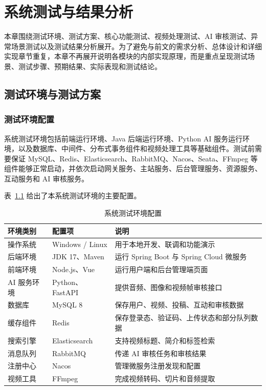 
\chapter{系统测试与结果分析}
\label{chap:system-test-analysis}

本章围绕测试环境、测试方案、核心功能测试、视频处理测试、AI 审核测试、异常场景测试以及测试结果分析展开。为了避免与前文的需求分析、总体设计和详细实现章节重复，本章不再展开说明各模块的内部实现原理，而是重点呈现测试场景、测试步骤、预期结果、实际表现和测试结论。

\section{测试环境与测试方案}
\label{sec:test-env-plan}

\subsection{测试环境配置}
\label{subsec:test-env-config}

系统测试环境包括前端运行环境、Java 后端运行环境、Python AI 服务运行环境，以及数据库、中间件、分布式事务组件和视频处理工具等基础组件。测试前需要保证 MySQL、Redis、Elasticsearch、RabbitMQ、Nacos、Seata、FFmpeg 等组件能够正常启动，并依次启动网关服务、主站服务、后台管理服务、资源服务、互动服务和 AI 审核服务。

表~\ref{tab:test-env-config} 给出了本系统测试环境的主要配置。

\begin{table}[htbp]
  \centering
  \caption{系统测试环境配置}
  \label{tab:test-env-config}
  \begin{tabular}{p{}p{}p{}}
    \hline
    \textbf{环境类别} & \textbf{配置项} & \textbf{说明} \\
    \hline
    操作系统 & Windows / Linux & 用于本地开发、联调和功能演示 \\
    后端环境 & JDK 17、Maven & 运行 Spring Boot 与 Spring Cloud 微服务 \\
    前端环境 & Node.js、Vue & 运行用户端和后台管理端页面 \\
    AI 服务环境 & Python、FastAPI & 提供音频、图像和视频帧审核接口 \\
    数据库 & MySQL 8 & 保存用户、视频、投稿、互动和审核数据 \\
    缓存组件 & Redis & 保存登录态、验证码、上传状态和部分队列数据 \\
    搜索引擎 & Elasticsearch & 支持视频标题、简介和标签检索 \\
    消息队列 & RabbitMQ & 传递 AI 审核任务和审核结果 \\
    注册中心 & Nacos & 管理微服务注册发现和配置 \\
    视频工具 & FFmpeg & 完成视频转码、切片和音频提取 \\
    \hline
  \end{tabular}
\end{table}


